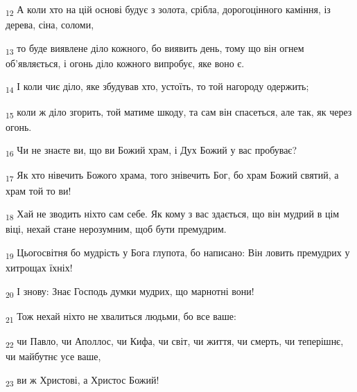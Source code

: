\begin{tcolorbox}
\textsubscript{12} А коли хто на цій основі будує з золота, срібла, дорогоцінного каміння, із дерева, сіна, соломи,
\end{tcolorbox}
\begin{tcolorbox}
\textsubscript{13} то буде виявлене діло кожного, бо виявить день, тому що він огнем об'являється, і огонь діло кожного випробує, яке воно є.
\end{tcolorbox}
\begin{tcolorbox}
\textsubscript{14} І коли чиє діло, яке збудував хто, устоїть, то той нагороду одержить;
\end{tcolorbox}
\begin{tcolorbox}
\textsubscript{15} коли ж діло згорить, той матиме шкоду, та сам він спасеться, але так, як через огонь.
\end{tcolorbox}
\begin{tcolorbox}
\textsubscript{16} Чи не знаєте ви, що ви Божий храм, і Дух Божий у вас пробуває?
\end{tcolorbox}
\begin{tcolorbox}
\textsubscript{17} Як хто нівечить Божого храма, того знівечить Бог, бо храм Божий святий, а храм той то ви!
\end{tcolorbox}
\begin{tcolorbox}
\textsubscript{18} Хай не зводить ніхто сам себе. Як кому з вас здається, що він мудрий в цім віці, нехай стане нерозумним, щоб бути премудрим.
\end{tcolorbox}
\begin{tcolorbox}
\textsubscript{19} Цьогосвітня бо мудрість у Бога глупота, бо написано: Він ловить премудрих у хитрощах їхніх!
\end{tcolorbox}
\begin{tcolorbox}
\textsubscript{20} І знову: Знає Господь думки мудрих, що марнотні вони!
\end{tcolorbox}
\begin{tcolorbox}
\textsubscript{21} Тож нехай ніхто не хвалиться людьми, бо все ваше:
\end{tcolorbox}
\begin{tcolorbox}
\textsubscript{22} чи Павло, чи Аполлос, чи Кифа, чи світ, чи життя, чи смерть, чи теперішнє, чи майбутнє усе ваше,
\end{tcolorbox}
\begin{tcolorbox}
\textsubscript{23} ви ж Христові, а Христос Божий!
\end{tcolorbox}
